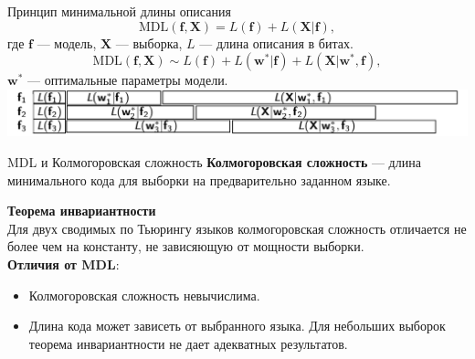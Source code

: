 \documentclass[10pt,pdf,utf8,russian,aspectratio=169]{beamer}
\begin{document}
\begin{frame}{Принцип минимальной длины описания}
\[
\text{MDL}(\mathbf{f}, \mathbf{X}) = L(\mathbf{f}) + L(\mathbf{X}|\mathbf{f}),
\]
где $\mathbf{f}$ --- модель, $\mathbf{X}$ --- выборка, $L$ --- длина описания в битах.
\\
\[
\text{MDL}(\mathbf{f}, \mathbf{X}) \sim L(\mathbf{f}) + L(\mathbf{w}^*| \mathbf{f}) + L(\mathbf{X}|\mathbf{w}^*, \mathbf{f}),
\]
$\mathbf{w}^*$ --- оптимальные параметры модели.\\

\includegraphics[width=\textwidth]{./mdl.png}

\end{frame}

\begin{frame}{MDL и Колмогоровская сложность}
\textbf{Колмогоровская сложность} --- длина минимального кода для выборки на предварительно заданном языке.

\textbf{Теорема инвариантности}\\
Для двух сводимых по Тьюрингу языков колмогоровская сложность  отличается не более чем на константу, не зависяющую от мощности выборки.\\

\textbf{Отличия от MDL}:
\begin{itemize}
\item Колмогоровская сложность невычислима.
\item Длина кода может зависеть от выбранного языка. Для небольших выборок теорема инвариантности не дает адекватных результатов.
\end{itemize}
\end{frame}
\end{document}
